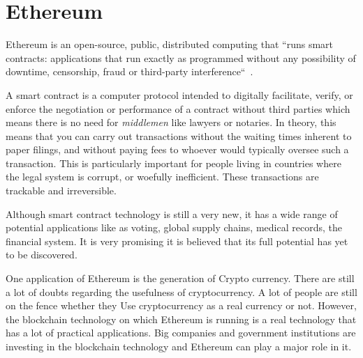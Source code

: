 \section{Ethereum}

Ethereum is an open-source, public, 
distributed computing that ``runs
smart contracts: applications that 
run exactly as programmed without
any possibility of downtime, censorship, 
fraud or third-party
interference``~\cite{hid-sp18-506-EthereumOrg}.

A smart contract is a computer protocol 
intended to digitally
facilitate, verify, or enforce the 
negotiation or performance of a
contract without third parties which 
means there is no need for
\emph{middlemen} like lawyers or 
notaries. In theory, this means that
you can carry out transactions 
without the waiting times inherent to
paper filings, and without paying 
fees to whoever would typically
oversee such a transaction. 
This is particularly important 
for people living in countries 
where the legal system is corrupt, 
or woefully inefficient. 
These transactions are trackable and irreversible.

Although smart contract technology 
is still a very new, it has a wide
range of potential applications 
like as voting, global supply chains,
medical records, the financial system. 
It is very promising it is
believed that its full potential 
has yet to be discovered.


One application of Ethereum is the generation 
of Crypto currency. There are still a lot
of doubts regarding the usefulness of 
cryptocurrency. A lot of people are still on the
fence whether they Use cryptocurrency as a real
currency or not. However, the blockchain 
technology on which Ethereum is running is a
real technology that has a lot of practical
applications. Big companies and government 
institutions are investing in the blockchain 
technology and Ethereum can play a major role 
in it.
